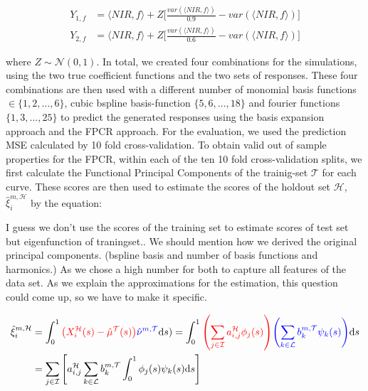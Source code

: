 \documentclass[11pt,twoside,a4paper]{article}
\begin{document}
		\begin{equation}
			\begin{split}
				Y_{1,f} & = \langle NIR, f\rangle + Z  \biggl\lbrack\frac{var(\langle NIR, f\rangle)}{0.9} - var(\langle NIR, f\rangle)\biggr\rbrack \\
				Y_{2,f} & = \langle NIR, f\rangle + Z  \biggl\lbrack\frac{var(\langle NIR, f\rangle)}{0.6} - var(\langle NIR, f\rangle)\biggr\rbrack
			\end{split}
		\end{equation}
		
		where $Z \sim \mathcal{N}(0,1)$. In total, we created four combinations for the simulations, using the two true coefficient functions and the two sets of responses. These four combinations are then used with a different number of monomial basis functions $ \in \{1,2, \dots, 6\}$, cubic bspline basis-function $\{5,6,...,18\}$ and fourier functions $\{1,3,...,25\}$ to predict the generated responses using the basis expansion approach and the FPCR approach. For the evaluation, we used the prediction MSE calculated by 10 fold cross-validation.
		 To obtain valid out of sample properties for the FPCR, within each of the ten 10 fold cross-validation splits, we first calculate the Functional Principal Components of the trainig-set $\mathcal{T}$ for each curve. These scores are then used to estimate the scores of the holdout set $\mathcal{H}$, $\hat{\xi}_{i}^{m, \mathcal{H}}$  by the equation:
		 
		 {\color{orange}I guess we don't use the scores of the training set to estimate scores of test set but eigenfunction of traningset..}
		 {\color{blue} We should mention how we derived the original principal components. (bspline basis and number of basis functions and harmonics.) As we chose a high number for both to capture all features of the data set. As we explain the approximations for the estimation, this question could come up, so we have to make it specific.}
		 
	\begin{equation}
		\begin{split}
			\hat{\xi}_{i}^{m, \mathcal{H}} &=  \int_{0}^{1} {\color{red} \left(X_{i}^{\mathcal{H}}(s) - \hat{\mu}^{\mathcal{T}}(s)\right)} {\color{blue}\hat{\nu}^{m, \mathcal{T}} }\mathrm{d}s) 
						    = \int_{0}^{1} {\color{red}\left(\sum_{j \in \mathcal{I}} a_{i,j}^{\mathcal{H}} \phi_j(s)\right)} {\color{blue}\left(\sum_{k \in \mathcal{L}} b_{k}^{m, \mathcal{T}} \psi_{k}(s)\right)} \mathrm{d}s \\
			 &= \sum_{j \in \mathcal{I}} \left[ a_{i,j}^{\mathcal{H}}\sum_{k \in \mathcal{L}}  b_{k}^{m, \mathcal{T}} \int_{0}^{1} \phi_j(s) \psi_{k}(s)\mathrm{d}s\right]
		\end{split}
	\end{equation}
	\vspace{	0.2cm}
	
\end{document}
